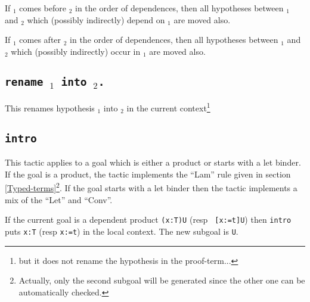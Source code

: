If {\ident$_1$} comes before {\ident$_2$} in the order of dependences,
then all hypotheses between {\ident$_1$} and {\ident$_2$} which
(possibly indirectly) depend on {\ident$_1$} are moved also.

If {\ident$_1$} comes after {\ident$_2$} in the order of dependences,
then all hypotheses between {\ident$_1$} and {\ident$_2$} which 
(possibly indirectly) occur in {\ident$_1$} are moved also.

\begin{ErrMsgs}
\item {}

\item {}
\item {}
\end{ErrMsgs}

\subsection{\tt rename {\ident$_1$} into {\ident$_2$}.}
This renames hypothesis {\ident$_1$} into {\ident$_2$} in the current
context\footnote{but it does not rename the hypothesis in the
proof-term...}

\begin{ErrMsgs}
\item {}

\item {}
\end{ErrMsgs}

\subsection{\tt intro}
\label{intro}
This tactic applies to a goal which is either a product or starts with
a let binder. If the goal is a product, the tactic implements the
``Lam'' rule given in section
\ref{Typed-terms}\footnote{Actually, only the second subgoal will be
generated since the other one can be automatically checked.}.  If the
goal starts with a let binder then the tactic implements a mix of the
``Let'' and ``Conv''.

If the current goal is a dependent product {\tt (x:T)U} (resp {\tt
[x:=t]U}) then {\tt intro} puts {\tt x:T} (resp {\tt x:=t}) in the
local context.
The new subgoal is {\tt U}.

